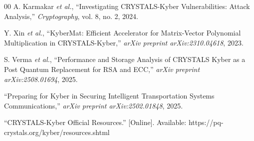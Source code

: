 \documentclass{ieeeaccess}
\begin{document}
\begin{thebibliography}{00}
A. Karmakar \textit{et al.}, ``Investigating CRYSTALS-Kyber Vulnerabilities: Attack Analysis,'' \textit{Cryptography}, vol. 8, no. 2, 2024.

Y. Xin \textit{et al.}, ``KyberMat: Efficient Accelerator for Matrix-Vector Polynomial Multiplication in CRYSTALS-Kyber,'' \textit{arXiv preprint arXiv:2310.04618}, 2023.

S. Verma \textit{et al.}, ``Performance and Storage Analysis of CRYSTALS Kyber as a Post Quantum Replacement for RSA and ECC,'' \textit{arXiv preprint arXiv:2508.01694}, 2025.

``Preparing for Kyber in Securing Intelligent Transportation Systems Communications,'' \textit{arXiv preprint arXiv:2502.01848}, 2025.

``CRYSTALS-Kyber Official Resources.'' [Online]. Available: https://pq-crystals.org/kyber/resources.shtml

\end{thebibliography}

\EOD
\end{document}

